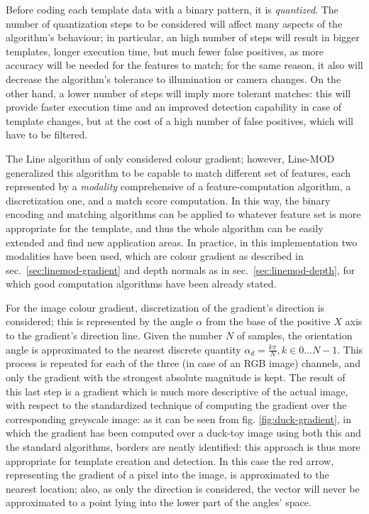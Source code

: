 Before coding each template data with a binary pattern, it is
\emph{quantized}. The number of quantization steps to be considered
will affect many aspects of the algorithm's behaviour; in particular,
an high number of steps will result in bigger templates, longer
execution time, but much fewer false positives, as more accuracy will
be needed for the features to match; for the same reason, it also will
decrease the algorithm's tolerance to illumination or camera
changes. On the other hand, a lower number of steps will imply more
tolerant matches: this will provide faster execution time and an
improved detection capability in case of template changes, but at the
cost of a high number of false positives, which will have to be filtered.

The Line algorithm of \cite{linemod-origins} only considered colour gradient; however, Line-MOD
generalized this algorithm to be capable to match different set of
features, each represented by a \emph{modality} comprehensive of a
feature-computation algorithm, a discretization one, and a match score
computation. In this way, the binary encoding and matching algorithms
can be applied to whatever feature set is more appropriate for the
template, and thus the whole algorithm can be easily extended and find
new application areas. In practice, in this implementation two
modalities have been used, which are colour gradient as described in
sec.~\ref{sec:linemod-gradient} and depth normals as in
sec.~\ref{sec:linemod-depth}, for which good computation algorithms have
been already stated.

For the image colour gradient, discretization of the gradient's direction is
considered; this is represented by the angle $\alpha$ from the
base of the positive $X$ axis to the gradient's direction line. Given
the number $N$ of samples, the orientation angle is approximated to
the nearest discrete quantity $\alpha_d = \frac{k\pi}{N}, k \in
{0\dots N-1}$. 
This process is repeated for each of the three (in case of an RGB
image) channels, and only the gradient with the strongest absolute
magnitude is kept. The result of this last step is a gradient which is
much more descriptive of the actual image, with respect to the
standardized technique of computing the gradient over the
corresponding greyscale image: as it can be seen from
fig. \ref{fig:duck-gradient}, in which the gradient has been computed
over a duck-toy image using both this and the standard algorithms,
borders are neatly identified: this approach is thus more appropriate for
template creation and detection. In this case the red arrow,
representing the gradient of a pixel into the image, is approximated
to the nearest location; also, as only the direction is considered,
the vector will never be approximated to a point lying into the lower
part of the angles' space.

